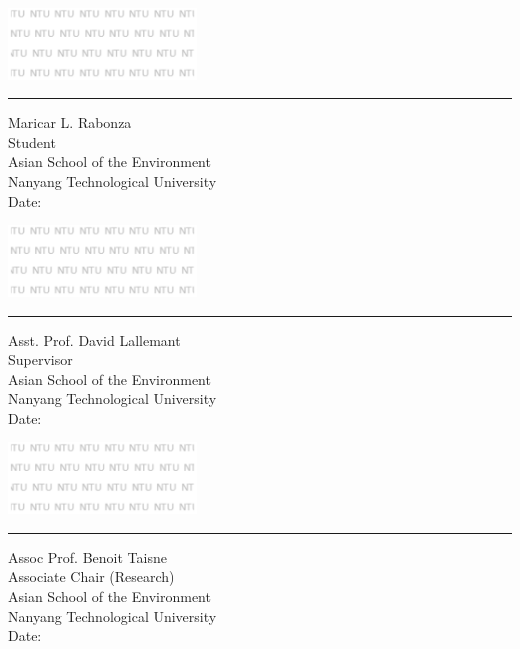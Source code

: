 {\noindent 
\parbox[b]{0.4\linewidth}{%
    \strut 
    \includegraphics[width=5cm]{class/logos/ase_watermark.png}
    \hrule
    \vspace{0.5cm}
    Maricar L. Rabonza \\
    Student\\
    Asian School of the Environment \\
    Nanyang Technological University \\
    Date: } 
\hspace{1cm} %
\parbox[b]{0.4\linewidth}{%
    \strut 
    \includegraphics[width=5cm]{class/logos/ase_watermark.png}
    \hrule
    \vspace{0.5cm}
    Asst. Prof. David Lallemant \\
    Supervisor \\
    Asian School of the Environment \\
    Nanyang Technological University \\
    Date: } 
    
\vspace{1.5cm}
\noindent 
\parbox[b]{0.4\linewidth}{%
    \strut 
    \includegraphics[width=5cm]{class/logos/ase_watermark.png}
    \hrule
    \vspace{0.5cm}
    Assoc Prof. Benoit Taisne \\
    Associate Chair (Research) \\
    Asian School of the Environment \\
    Nanyang Technological University \\
    Date: } 


}